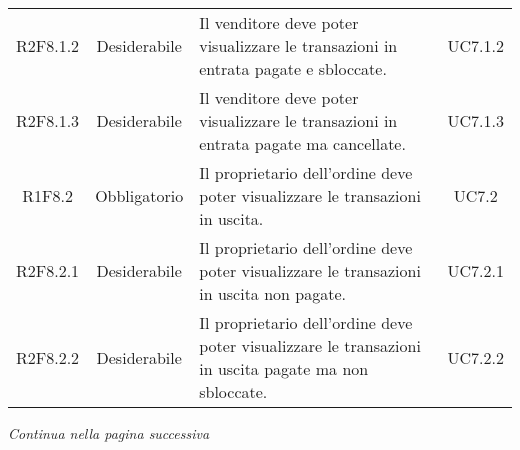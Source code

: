 \begin{table}[H]
\begin{tabular}{c | c | p{6cm} | c}
        R2F8.1.2                                                          & Desiderabile & Il venditore deve poter visualizzare le transazioni in entrata pagate e sbloccate.                                    & UC7.1.2                  \\
        R2F8.1.3                                                          & Desiderabile & Il venditore deve poter visualizzare le transazioni in entrata pagate ma cancellate.                                  & UC7.1.3                  \\
        R1F8.2                                                            & Obbligatorio & Il proprietario dell'ordine deve poter visualizzare le transazioni in uscita.                                         & UC7.2                    \\
        R2F8.2.1                                                          & Desiderabile & Il proprietario dell'ordine deve poter visualizzare le transazioni in uscita non pagate.                              & UC7.2.1                  \\
        R2F8.2.2                                                          & Desiderabile & Il proprietario dell'ordine deve poter visualizzare le transazioni in uscita pagate ma non sbloccate.                 & UC7.2.2                  \\
    \end{tabular}
\end{table}
\begin{center}
    \textit{\small Continua nella pagina successiva}
\end{center}
